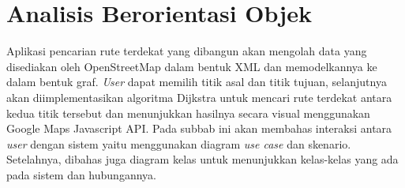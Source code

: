 \section{Analisis Berorientasi Objek}
Aplikasi pencarian rute terdekat yang dibangun akan mengolah data yang
disediakan oleh OpenStreetMap dalam bentuk XML dan memodelkannya ke dalam bentuk graf. 
\textit{User} dapat memilih titik asal dan titik tujuan, selanjutnya akan
diimplementasikan algoritma Dijkstra untuk mencari rute terdekat antara kedua titik 
tersebut dan menunjukkan hasilnya secara visual menggunakan Google Maps
Javascript API. Pada subbab ini akan membahas interaksi antara \textit{user}
dengan sistem yaitu menggunakan diagram \textit{use case} dan skenario. Setelahnya,
dibahas juga diagram kelas untuk menunjukkan kelas-kelas yang ada pada sistem
dan hubungannya.


